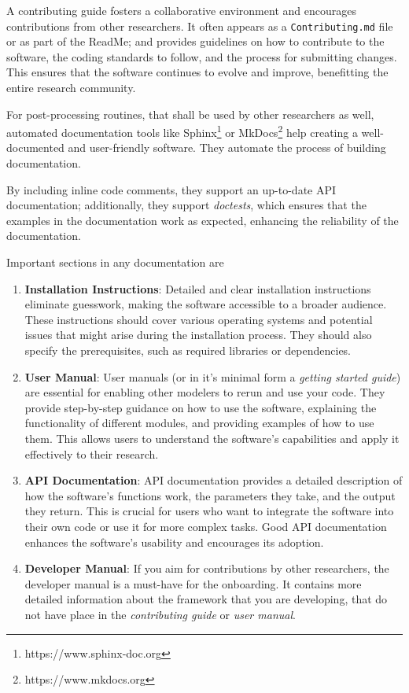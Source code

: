 \documentclass[preprint,11pt,5p]{elsarticle}
\begin{document}
A contributing guide fosters a collaborative environment and encourages
contributions from other researchers. It often appears as a
\texttt{Contributing.md} file or as part of the ReadMe; and provides
guidelines on how to contribute to the software, the coding standards to
follow, and the process for submitting changes. This ensures that the
software continues to evolve and improve, benefitting the entire
research community.

For post-processing routines, that shall be used by other researchers as
well, automated documentation tools like Sphinx\footnote{https://www.sphinx-doc.org}
or MkDocs\footnote{https://www.mkdocs.org} help creating a
well-documented and user-friendly software. They automate the process of
building documentation.

By including inline code comments, they support an up-to-date API
documentation; additionally, they support \emph{doctests}, which ensures
that the examples in the documentation work as expected, enhancing the
reliability of the documentation.

Important sections in any documentation are

\begin{enumerate}
\def\labelenumi{\arabic{enumi}.}
\item
  \textbf{Installation Instructions}: Detailed and clear installation
  instructions eliminate guesswork, making the software accessible to a
  broader audience. These instructions should cover various operating
  systems and potential issues that might arise during the installation
  process. They should also specify the prerequisites, such as required
  libraries or dependencies.
\item
  \textbf{User Manual}: User manuals (or in it's minimal form a
  \emph{getting started guide}) are essential for enabling other
  modelers to rerun and use your code. They provide step-by-step
  guidance on how to use the software, explaining the functionality of
  different modules, and providing examples of how to use them. This
  allows users to understand the software's capabilities and apply it
  effectively to their research.
\item
  \textbf{API Documentation}: API documentation provides a detailed
  description of how the software's functions work, the parameters they
  take, and the output they return. This is crucial for users who want
  to integrate the software into their own code or use it for more
  complex tasks. Good API documentation enhances the software's
  usability and encourages its adoption.
\item
  \textbf{Developer Manual}: If you aim for contributions by other
  researchers, the developer manual is a must-have for the onboarding.
  It contains more detailed information about the framework that you are
  developing, that do not have place in the \emph{contributing guide} or
  \emph{user manual}.
\end{enumerate}
\end{document}
